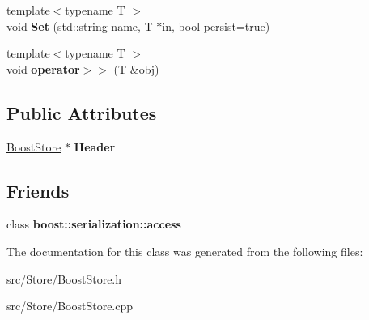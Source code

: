 \begin{DoxyCompactItemize}
\item 
\hypertarget{classBoostStore_a198a7f41e16912b439b85523f802ad0f}{{\footnotesize template$<$typename T $>$ }\\void {\bfseries Set} (std\-::string name, T $\ast$in, bool persist=true)}\label{classBoostStore_a198a7f41e16912b439b85523f802ad0f}

\item 
\hypertarget{classBoostStore_a4f1bce161785c396eb407adf3ab4491e}{{\footnotesize template$<$typename T $>$ }\\void {\bfseries operator$>$$>$} (T \&obj)}\label{classBoostStore_a4f1bce161785c396eb407adf3ab4491e}

\end{DoxyCompactItemize}
\subsection*{Public Attributes}
\begin{DoxyCompactItemize}
\item 
\hypertarget{classBoostStore_a3bfb8ffc972b7f0318b17018eaa37af2}{\hyperlink{classBoostStore}{Boost\-Store} $\ast$ {\bfseries Header}}\label{classBoostStore_a3bfb8ffc972b7f0318b17018eaa37af2}

\end{DoxyCompactItemize}
\subsection*{Friends}
\begin{DoxyCompactItemize}
\item 
\hypertarget{classBoostStore_ac98d07dd8f7b70e16ccb9a01abf56b9c}{class {\bfseries boost\-::serialization\-::access}}\label{classBoostStore_ac98d07dd8f7b70e16ccb9a01abf56b9c}

\end{DoxyCompactItemize}


The documentation for this class was generated from the following files\-:\begin{DoxyCompactItemize}
\item 
src/\-Store/Boost\-Store.\-h\item 
src/\-Store/Boost\-Store.\-cpp\end{DoxyCompactItemize}
